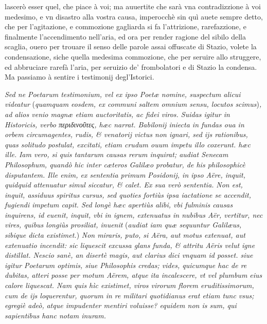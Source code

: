 \documentclass[11pt,twoside,openany]{book}
\begin{document}
lascerò esser quel, che piace à voi; ma auuertite che sarà vna contradizzione à voi medesimo, e vn disastro alla vostra causa, imperocchè sin quì auete sempre detto, che per l'agitazione, e commozione gagliarda si fa l'attrizione, rarefazzione, e finalmente l'accendimento nell'aria, ed ora per render ragione del sibilo della scaglia, ouero per trouare il senso delle parole assai offuscate di Stazio, volete la condensazione, siche quella medesima commozione, che per seruire allo struggere, ed abbruciare rarefà l'aria, per seruizio de' frombolatori e di Stazio la condensa. Ma passiamo à sentire i testimonij degl'Istorici.



\par\bigskip\noindent{}\enspace \textit{Sed ne Poetarum testimonium, vel ex ipso Poetæ nomine, suspectum alicui videatur }(\textit{quamquam eosdem, ex communi saltem omnium sensu, locutos scimus})\textit{, ad alios venio magnæ etiam auctoritatis, ac fidei viros. Suidas igitur in Historicis, verbo περιδινοῦτες, hæc narrat. Babilonij iniecta in fundas oua in orbem circumagentes, rudis, \& venatorij victus non ignari, sed ijs rationibus, quas solitudo postulat, excitati, etiam crudum ouum impetu illo coxerunt. hæc ille. }\textit{Iam vero, si quis tantarum causas rerum inquirat; audiat Senecam Philosophum, quandò hic inter cæteros Galilæo probatur, de his philosophicè disputantem. }\textit{Ille enim, ex sententia primum Posidonij, in ipso Aëre, inquit, quidquid attenuatur simul siccatur, \& calet. Ex sua verò sententia. }\textit{Non est, inquit, assiduus spiritus cursus, sed quoties fortiùs ipsa iactatione se accendit, fugiendi impetum capit. Sed longè hæc apertiùs alibi, vbi fulminis causas inquirens, id euenit, inquit, vbi in ignem, extenuatus in nubibus Aër, vertitur, nec vires, quibus longiùs prosiliat, inuenit }(\textit{audiat iam quæ sequuntur Galilæus, sibique dicta existimet.})\textit{ Non miraris, puto, si Aëra, aut motus extenuat, aut extenuatio incendit: sic liquescit excussa glans funda, \& attritu Aëris velut igne distillat. Nescio sanè, an disertè magis, aut clarius dici vnquam id posset. siue igitur Poetarum optimis, siue Philosophis credas; vides, quicumque hac de re dubitas, atteri posse per motum Aërem, atque ita incalescere, vt vel plumbum eius calore liquescat. Nam quis hìc existimet, viros virorum florem eruditissimorum, cum de ijs loquerentur, quorum in re militari quotidianus erat etiam tunc vsus; egregiè adeò, }\textit{atque impudenter mentiri voluisse? equidem non is sum, qui sapientibus hanc notam inuram.}
\end{document}
